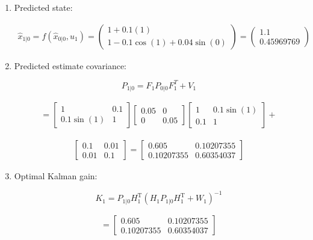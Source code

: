 \begin{enumerate}
\item
  Predicted state:

  \[\begin{aligned}
  \hat{x}_{1|0} = f(\hat{x}_{0|0}, u_{1})  =\begin{pmatrix} 1+0.1(1) \\ 1 - 0.1\cos(1) + 0.04\sin(0) \end{pmatrix} =   \begin{pmatrix} 1.1 \\ 0.45969769\end{pmatrix}
  \end{aligned}\]
\item
  Predicted estimate covariance:

  \[P_{1|0} = F_{1} P_{0|0} F_{1}^{T} + V_{1}\]

  \[\begin{aligned}
  =  \begin{bmatrix} 1 & 0.1 \\ 0.1\sin(1) & 1 \end{bmatrix}   \begin{bmatrix} 0.05 & 0 \\ 0 & 0.05   \end{bmatrix} \begin{bmatrix} 1 & 0.1\sin(1) \\ 0.1 & 1 \end{bmatrix} +
  \end{aligned}\]

  \[\begin{aligned}
  \begin{bmatrix} 0.1&0.01\\0.01& 0.1\end{bmatrix}
  =  \begin{bmatrix} 0.605   &    0.10207355 \\
   0.10207355  &  0.60354037 \end{bmatrix}
  \end{aligned}\]
\item
  Optimal Kalman gain:

  \[K_1 = P_{1|0}H_1^\text{T}\left(H_1
  P_{1|0} H_1^\text{T} + W_1\right)^{-1}\]

  \[\begin{aligned}
  =  \begin{bmatrix} 0.605   &    0.10207355 \\
   0.10207355  &  0.60354037 \end{bmatrix}
  \end{aligned}\]


\end{enumerate}
